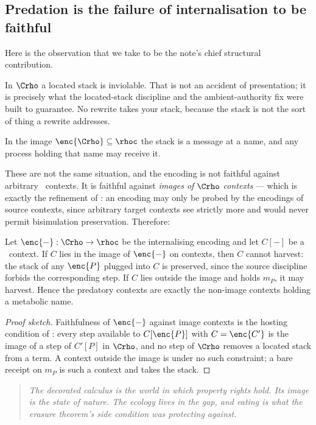 \subsection{Predation is the failure of internalisation to be faithful}\label{sci:S7.3}

Here is the observation that we take to be the note's chief structural contribution.

In $\Crho$ a located stack is inviolable. That is not an accident of presentation; it is precisely
what the located-stack discipline and the ambient-authority fix were built to guarantee. No rewrite
takes your stack, because the stack is not the sort of thing a rewrite addresses.

In the image $\enc{\Crho} \subseteq \rhoc$ the stack is a message at a name, and any process holding
that name may receive it.

These are not the same situation, and the encoding is not faithful against arbitrary \rhoc\ contexts.
It is faithful against \emph{images of $\Crho$ contexts} --- which is exactly the refinement of
\cite{Probing}: an encoding may only be probed by the encodings of source contexts, since arbitrary
target contexts see strictly more and would never permit bisimulation preservation. Therefore:

\begin{theorem}
\label{sci:thm:predator}
Let $\enc{-} : \Crho \to \rhoc$ be the internalising encoding and let $C[-]$ be a \rhoc\ context. If
$C$ lies in the image of $\enc{-}$ on contexts, then $C$ cannot harvest: the stack of any
$\enc{P}$ plugged into $C$ is preserved, since the source discipline forbids the corresponding step.
If $C$ lies outside the image and holds $m_P$, it may harvest. Hence the predatory contexts are
exactly the non-image contexts holding a metabolic name.
\end{theorem}

\begin{proof}[Proof sketch]
Faithfulness of $\enc{-}$ against image contexts is the hosting condition of \cite{Probing}: every
step available to $C[\enc{P}]$ with $C = \enc{C'}$ is the image of a step of $C'[P]$ in $\Crho$, and
no step of $\Crho$ removes a located stack from a term. A context outside the image is under no such
constraint; a bare receipt on $m_P$ is such a context and takes the stack.
\end{proof}

\begin{quote}
\itshape The decorated calculus is the world in which property rights hold. Its image is the state of
nature. The ecology lives in the gap, and eating is what the erasure theorem's side condition was
protecting against.
\end{quote}

